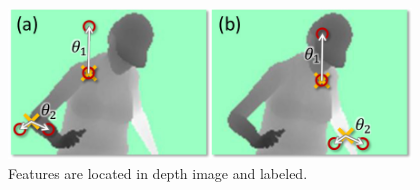 \begin{figure}
	[h] \centering 
	\includegraphics[height=4cm]{figures/content/ni-label.jpg} \caption{Features are located in depth image and labeled. \cite{2}} \label{fg:ni:label} 
\end{figure}
